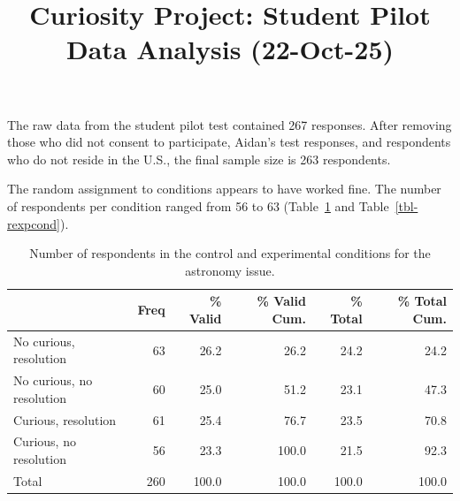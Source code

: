 \documentclass[
  letterpaper,
  DIV=11,
  numbers=noendperiod]{scrartcl}
\title{Curiosity Project: Student Pilot Data Analysis (22-Oct-25)}
\author{}
\date{}
\renewcommand*\contentsname{Table of contents}
\newcommand\contentsname{Table of contents}
\begin{document}
\maketitle
{}

\ifdefined\Shaded\renewenvironment{Shaded}{\begin{tcolorbox}[borderline west={3pt}{0pt}{shadecolor}, enhanced, interior hidden, breakable, sharp corners, frame hidden, boxrule=0pt]}{\end{tcolorbox}}\fi

\renewcommand*\contentsname{Table of contents}
{
\hypersetup{linkcolor=}
\setcounter{tocdepth}{3}
\tableofcontents
}
The raw data from the student pilot test contained 267 responses. After
removing those who did not consent to participate, Aidan's test
responses, and respondents who do not reside in the U.S., the final
sample size is 263 respondents.

The random assignment to conditions appears to have worked fine. The
number of respondents per condition ranged from 56 to 63
(Table~\ref{tbl-aexpcond} and Table~\ref{tbl-rexpcond}).

\hypertarget{tbl-aexpcond}{}
\begin{table}
\caption{\label{tbl-aexpcond}Number of respondents in the control and experimental conditions for the
astronomy issue. }\tabularnewline

\centering
\begin{tabular}[t]{l|r|r|r|r|r}
\hline
  & Freq & \% Valid & \% Valid Cum. & \% Total & \% Total Cum.\\
\hline
No curious, resolution & 63 & 26.2 & 26.2 & 24.2 & 24.2\\
\hline
No curious, no resolution & 60 & 25.0 & 51.2 & 23.1 & 47.3\\
\hline
Curious, resolution & 61 & 25.4 & 76.7 & 23.5 & 70.8\\
\hline
Curious, no resolution & 56 & 23.3 & 100.0 & 21.5 & 92.3\\
\hline
Total & 260 & 100.0 & 100.0 & 100.0 & 100.0\\
\hline
\end{tabular}
\end{table}
\end{document}

